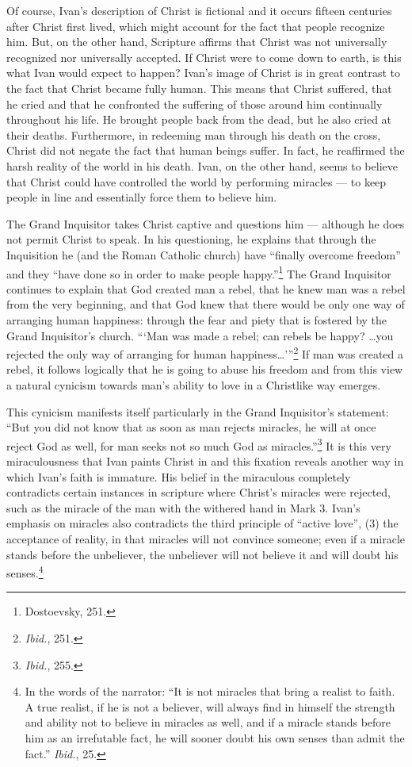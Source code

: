Of course, Ivan's description of Christ is fictional and it occurs fifteen centuries after Christ first lived, which might account for the fact that people recognize him. But, on the other hand, Scripture affirms that Christ was not universally recognized nor universally accepted. If Christ were to come down to earth, is this what Ivan would expect to happen? Ivan's image of Christ is in great contrast to the fact that Christ became fully human. This means that Christ suffered, that he cried and that he confronted the suffering of those around him continually throughout his life. He brought people back from the dead, but he also cried at their deaths. Furthermore, in redeeming man through his death on the cross, Christ did not negate the fact that human beings suffer. In fact, he reaffirmed the harsh reality of the world in his death. Ivan, on the other hand, seems to believe that Christ could have controlled the world by performing miracles --- to keep people in line and essentially force them to believe him.

The Grand Inquisitor takes Christ captive and questions him --- although he does not permit Christ to speak. In his questioning, he explains that through the Inquisition he (and the Roman Catholic church) have ``finally overcome freedom'' and they ``have done so in order to make people happy.''\footnote{Dostoevsky, 251.} The Grand Inquisitor continues to explain that God created man a rebel, that he knew man was a rebel from the very beginning, and that God knew that there would be only one way of arranging human happiness: through the fear and piety that is fostered by the Grand Inquisitor's church. ``\thinspace`Man was made a rebel; can rebels be happy? \ldots you rejected the only way of arranging for human happiness\ldots'\thinspace''\footnote{\emph{Ibid.}, 251.} If man was created a rebel, it follows logically that he is going to abuse his freedom and from this view a natural cynicism towards man's ability to love in a Christlike way emerges.

This cynicism manifests itself particularly in the Grand Inquisitor's statement: ``But you did not know that as soon as man rejects miracles, he will at once reject God as well, for man seeks not so much God as miracles.''\footnote{\emph{Ibid.}, 255.} It is this very miraculousness that Ivan paints Christ in and this fixation reveals another way in which Ivan's faith is immature. His belief in the miraculous completely contradicts certain instances in scripture where Christ's miracles were rejected, such as the miracle of the man with the withered hand in Mark 3. Ivan's emphasis on miracles also contradicts the third principle of ``active love'', (3) the acceptance of reality, in that miracles will not convince someone; even if a miracle stands before the unbeliever, the unbeliever will not believe it and will doubt his senses.\footnote{In the words of the narrator: ``It is not miracles that bring a realist to faith. A true realist, if he is not a believer, will always find in himself the strength and ability not to believe in miracles as well, and if a miracle stands before him as an irrefutable fact, he will sooner doubt his own senses than admit the fact.'' \emph{Ibid.}, 25.} 

